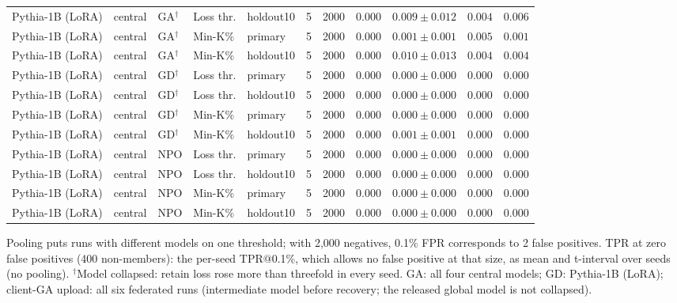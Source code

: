 \begin{table}[t]
\begin{tabular*}{\textwidth}{@{\extracolsep{\fill}}lllllcccccc@{}}
Pythia-1B (LoRA) & central & GA$^{\dagger}$ & Loss thr. & holdout10 & 5 & 2000 & $0.000$ & $0.009 \pm 0.012$ & $0.004$ & $0.006$ \\
Pythia-1B (LoRA) & central & GA$^{\dagger}$ & Min-K\% & primary & 5 & 2000 & $0.000$ & $0.001 \pm 0.001$ & $0.005$ & $0.001$ \\
Pythia-1B (LoRA) & central & GA$^{\dagger}$ & Min-K\% & holdout10 & 5 & 2000 & $0.000$ & $0.010 \pm 0.013$ & $0.004$ & $0.004$ \\
Pythia-1B (LoRA) & central & GD$^{\dagger}$ & Loss thr. & primary & 5 & 2000 & $0.000$ & $0.000 \pm 0.000$ & $0.000$ & $0.000$ \\
Pythia-1B (LoRA) & central & GD$^{\dagger}$ & Loss thr. & holdout10 & 5 & 2000 & $0.000$ & $0.000 \pm 0.000$ & $0.000$ & $0.000$ \\
Pythia-1B (LoRA) & central & GD$^{\dagger}$ & Min-K\% & primary & 5 & 2000 & $0.000$ & $0.000 \pm 0.000$ & $0.000$ & $0.000$ \\
Pythia-1B (LoRA) & central & GD$^{\dagger}$ & Min-K\% & holdout10 & 5 & 2000 & $0.000$ & $0.001 \pm 0.001$ & $0.000$ & $0.000$ \\
Pythia-1B (LoRA) & central & NPO & Loss thr. & primary & 5 & 2000 & $0.000$ & $0.000 \pm 0.000$ & $0.000$ & $0.000$ \\
Pythia-1B (LoRA) & central & NPO & Loss thr. & holdout10 & 5 & 2000 & $0.000$ & $0.000 \pm 0.000$ & $0.000$ & $0.000$ \\
Pythia-1B (LoRA) & central & NPO & Min-K\% & primary & 5 & 2000 & $0.000$ & $0.000 \pm 0.000$ & $0.000$ & $0.000$ \\
Pythia-1B (LoRA) & central & NPO & Min-K\% & holdout10 & 5 & 2000 & $0.000$ & $0.000 \pm 0.000$ & $0.000$ & $0.000$ \\
\bottomrule
\end{tabular*}

\smallskip
{\footnotesize Pooling puts runs with different models on one threshold; with 2,000 negatives, 0.1\% FPR corresponds to 2 false positives. TPR at zero false positives (400 non-members): the per-seed TPR@0.1\%, which allows no false positive at that size, as mean and t-interval over seeds (no pooling). $^{\dagger}$Model collapsed: retain loss rose more than threefold in every seed. GA: all four central models; GD: Pythia-1B (LoRA); client-GA upload: all six federated runs (intermediate model before recovery; the released global model is not collapsed).\par}
\end{table}
